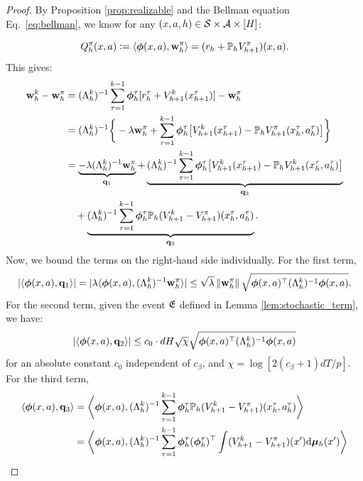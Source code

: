 \begin{proof}
By Proposition \ref{prop:realizable} and the Bellman equation Eq.~\eqref{eq:bellman}, we know for any $(x, a, h) \in \mathcal{S} \times \mathcal{A} \times [H]$:

\begin{equation*}
Q^\pi_h(x, a) \mathrel{\mathop:}=  \langle \bm{\phi}(x, a), \mathbf{w}^\pi_h\rangle = (r_h + \mathbb{P}_h {V}^{\pi}_{h+1})(x, a). 
\end{equation*}
This gives:
\begin{align*}
\mathbf{w}^k_h -  \mathbf{w}^\pi_h
&= (\Lambda^k_h)^{-1} \sum_{\tau = 1}^{k-1} \bm{\phi}^\tau_h [r^\tau_h + V^{k}_{h+1}(x^\tau_{h+1})]- \mathbf{w}^\pi_h  \\
&= (\Lambda^k_h)^{-1} \bigg \{-\lambda \mathbf{w}^\pi_h + \sum_{\tau = 1}^{k-1} \bm{\phi}^\tau_h \bigl [V^{k}_{h+1}(x^\tau_{h+1}) - \mathbb{P}_h {V}^{\pi}_{h+1}(x_h^\tau, a_h^\tau) \bigr ]\bigg\} \\
&= \underbrace{-\lambda (\Lambda^k_h)^{-1} \mathbf{w}^\pi_h}_{\mathbf{q}_1} + 
\underbrace{(\Lambda^k_h)^{-1} \sum_{\tau = 1}^{k-1} \bm{\phi}^\tau_h \big [V^{k}_{h+1}(x^\tau_{h+1}) - \mathbb{P}_h V^{k}_{h+1}(x_h^\tau, a_h^\tau)\big ]}_{\mathbf{q}_2} \\
&\quad + \underbrace{(\Lambda^k_h)^{-1}\sum_{\tau = 1}^{k-1} \bm{\phi}^\tau_h \mathbb{P}_h (V^{k}_{h+1} - V^\pi_{h+1})(x_h^\tau, a_h^\tau)}_{\mathbf{q}_3}. 
\end{align*}
Now, we bound the terms on the right-hand side individually.
For the first term,
\begin{equation*}
|\langle \bm{\phi}(x, a), \mathbf{q}_1\rangle| = |\lambda \langle \bm{\phi}(x, a), (\Lambda^k_h)^{-1} \mathbf{w}^\pi_h\rangle|
\le \sqrt{\lambda} \left\|{\mathbf{w}_h^\pi}\right\| \sqrt{\bm{\phi}(x, a)^{\top} (\Lambda^k_h)^{-1}  \bm{\phi}(x, a)}. 
\end{equation*}
For the second term, given the event $\mathfrak{E}$ defined in Lemma \ref{lem:stochastic_term}, we have:
\begin{equation*}
|\langle \bm{\phi}(x, a), \mathbf{q}_2\rangle| \le c_0\cdot dH\sqrt{\chi} \sqrt{\bm{\phi}(x, a)^{\top} (\Lambda^k_h)^{-1}  \bm{\phi}(x, a)} 
\end{equation*}
for an absolute constant $c_0$ independent of $c_\beta$, and $\chi = \log [2(c_\beta+1)dT/p]$. For the third term,
\begin{align*}
\la \bphi(x, a), \q_3\ra &= \bigg \la \bphi(x, a), (\Lambda^k_h)^{-1}\sum_{\tau = 1}^{k-1} \bphi^\tau_h \P_h (V^{k}_{h+1} - V^\pi_{h+1})(x_h^\tau, a_h^\tau) \bigg \ra\\
&=\bigg \la \bphi(x, a), (\Lambda^k_h)^{-1}\sum_{\tau = 1}^{k-1} \bphi^\tau_h (\bphi^\tau_h)\trans \int (V^{k}_{h+1} - V^\pi_{h+1})(x') \dd \bmu_h(x')\bigg\ra\\

\end{align*}
\end{proof}
